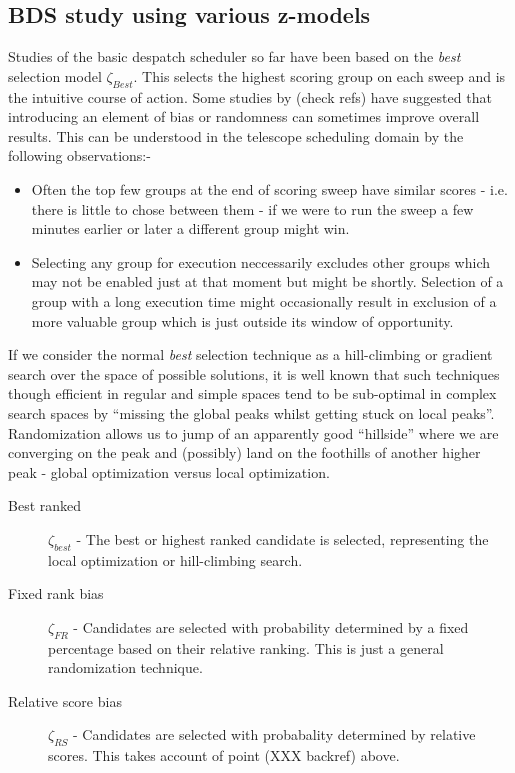 \subsection{BDS study using various z-models}
Studies of the basic despatch scheduler so far have been based on the \emph{best} selection model $\zeta_{Best}$. This selects the highest scoring group on each sweep and is the intuitive course of action. Some studies by (check refs) have suggested that introducing an element of bias or randomness can sometimes improve overall results. This can be understood in the telescope scheduling domain by the following observations:-
\begin{itemize}
\item Often the top few groups at the end of scoring sweep have similar scores - i.e. there is little to chose between them - if we were to run the sweep a few minutes earlier or later a different group might win. 
\item Selecting any group for execution neccessarily excludes other groups which may not be enabled just at that moment but might be shortly. Selection of a group with a long execution time might occasionally result in exclusion of a more valuable group which is just outside its window of opportunity.
\end{itemize}

If we consider the normal \emph{best} selection technique as a hill-climbing or gradient search over the space of possible solutions, it is well known that such techniques though efficient in regular and simple spaces tend to be sub-optimal in complex search spaces by ``missing the global peaks whilst getting stuck on local peaks''. Randomization allows us to jump of an apparently good ``hillside'' where we are converging on the peak and (possibly) land on the foothills of another higher peak - global optimization versus local optimization.


\begin{description}
\item [Best ranked] $\zeta_{best}$ - The best or highest ranked candidate is selected, representing the local optimization or hill-climbing search.

\item [Fixed rank bias] $\zeta_{FR}$ - Candidates are selected with probability determined by a fixed percentage based on their relative ranking. This is just a general randomization technique. 

\item [Relative score bias] $\zeta_{RS}$ - Candidates are selected with probabality determined by relative scores. This takes account of point (XXX backref) above.
\end{description}


